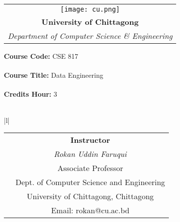 \documentclass[11pt]{article}
\begin{document}
	
	\begin{table}
		\centering
	\begin{tabular}{ c }
		 \texttt{[image: cu.png]} \\
	   \sffamily   \textbf{University of Chittagong }  \\
	  \sffamily \textit{ Department  of Computer  Science \& Engineering} \\
	\end{tabular}
\end{table}
	\vspace{10mm}
	
	\textbf {Course Code:} CSE 817\\\\
	\textbf {Course Title:}  Data Engineering \\\\
	\textbf {Credits Hour:} 3 \\\\
	
		\begin{table}[h!t]
		\centering
	\begin{tabular}{|l|}
		\hline
	\begin{tabular}{ l c } 
	& \textbf{Instructor}	 \\
	& \large \textit{Rokan Uddin Faruqui }\\
		& \large Associate Professor \\
		& Dept. of Computer Science and Engineering \\
		&  University of Chittagong, Chittagong \\
		& \large Email: rokan@cu.ac.bd \\ 
	\end{tabular}  
\\ \hline
\end{tabular}
\end{table}
	\vspace{5mm} 
\end{document}
